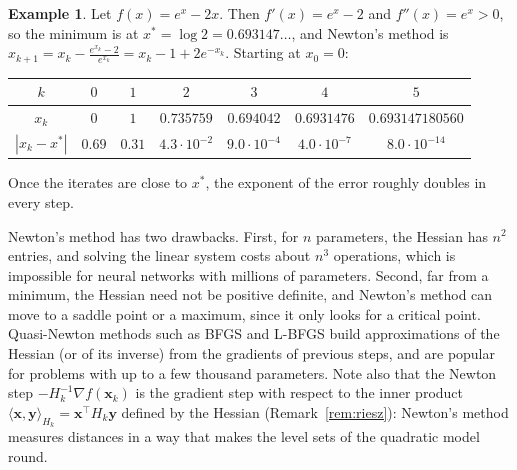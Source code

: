 \documentclass[11pt]{article}
\newcommand{\ip}[2]{\langle #1, #2 \rangle}
\theoremstyle{definition}
\newtheorem{example}[definition]{Example}
\theoremstyle{plain}
\theoremstyle{remark}
\begin{document}
\begin{example}\label{ex:newton}
    Let $f(x) = e^x - 2x$. Then $f'(x) = e^x - 2$ and $f''(x) = e^x > 0$, so the minimum is at $x^* = \log 2 = 0.693147\ldots$, and Newton's method is $x_{k+1} = x_k - \frac{e^{x_k} - 2}{e^{x_k}} = x_k - 1 + 2e^{-x_k}$. Starting at $x_0 = 0$:
    \begin{center}
        \renewcommand{\arraystretch}{1.2}
        \begin{tabular}{c|cccccc}
            $k$ & $0$ & $1$ & $2$ & $3$ & $4$ & $5$ \\
            \hline
            $x_k$ & $0$ & $1$ & $0.735759$ & $0.694042$ & $0.6931476$ & $0.693147180560$ \\
            $|x_k - x^*|$ & $0.69$ & $0.31$ & $4.3 \cdot 10^{-2}$ & $9.0 \cdot 10^{-4}$ & $4.0 \cdot 10^{-7}$ & $8.0 \cdot 10^{-14}$
        \end{tabular}
    \end{center}
    Once the iterates are close to $x^*$, the exponent of the error roughly doubles in every step.
\end{example}

Newton's method has two drawbacks. First, for $n$ parameters, the Hessian has $n^2$ entries, and solving the linear system costs about $n^3$ operations, which is impossible for neural networks with millions of parameters. Second, far from a minimum, the Hessian need not be positive definite, and Newton's method can move to a saddle point or a maximum, since it only looks for a critical point. Quasi-Newton methods such as BFGS and L-BFGS build approximations of the Hessian (or of its inverse) from the gradients of previous steps, and are popular for problems with up to a few thousand parameters. Note also that the Newton step $-H_k^{-1}\nabla f(\mathbf{x}_k)$ is the gradient step with respect to the inner product $\ip{\mathbf{x}}{\mathbf{y}}_{H_k} = \mathbf{x}^\top H_k\mathbf{y}$ defined by the Hessian (Remark~\ref{rem:riesz}): Newton's method measures distances in a way that makes the level sets of the quadratic model round.
\end{document}
